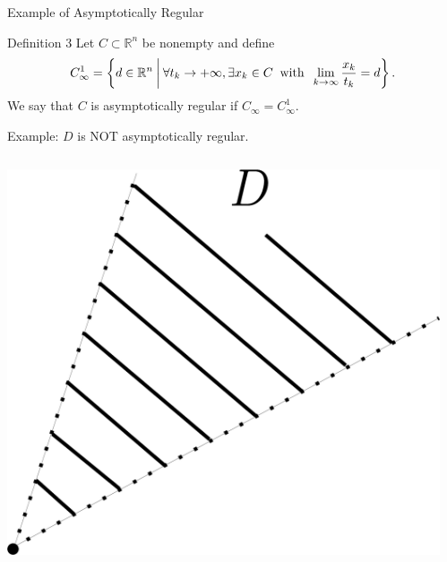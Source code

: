 \documentclass[aspectratio=169, dvipdfmx, 11pt]{beamer} %
\newcommand{\NDemenstionalRealEuclideanSpace}{\mathbb{R}^n}
\begin{document}
\begin{frame}{Example of Asymptotically Regular}
    \begin{block}{Definition 3}
        Let $C \subset \NDemenstionalRealEuclideanSpace$ be nonempty and define
        \begin{equation}
            C_{\infty}^1 = \left\{d \in \NDemenstionalRealEuclideanSpace \:\middle|\: \forall t_k \rightarrow + \infty , \exists x_k \in C \:\text{ with }\: \lim_{k \to \infty} \frac{x_k}{t_k} = d \right\}. \notag
        \end{equation}
        We say that $C$ is asymptotically regular if $C_{\infty} = C_{\infty}^1$.
    \end{block}

    Example: $D$ is NOT asymptotically regular.

    \centering
    \begin{columns}
        \begin{column}{0.48\textwidth}
        \centering
        \includegraphics[keepaspectratio, scale=0.085]{figures/example_not_asymptotically_regular_1.eps}
        \end{column}
        \pause
        \begin{column}{0.48\textwidth}
        \centering

\end{column}
\end{columns}
\end{frame}
\end{document}
